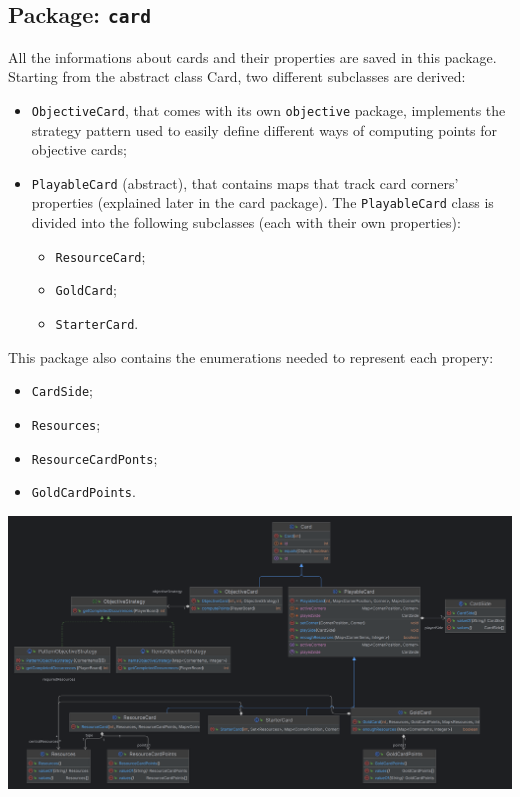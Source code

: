 \documentclass{article}
\begin{document}
\subsection{Package: \texttt{card}}
All the informations about cards and their properties are saved in this package.
Starting from the abstract class Card, two different subclasses are derived:
\begin{itemize}
    \item \texttt{ObjectiveCard}, that comes with its own \texttt{objective} package, implements the strategy pattern used to easily define different ways of computing points for objective cards;
    \item \texttt{PlayableCard} (abstract), that contains maps that track card corners' properties (explained later in the card package). \newline
    The \texttt{PlayableCard} class is divided into the following subclasses (each with their own properties):
    \begin{itemize}
        \item \texttt{ResourceCard};
        \item \texttt{GoldCard};
        \item \texttt{StarterCard}.
    \end{itemize}
\end{itemize}
This package also contains the enumerations needed to represent each propery:
\begin{itemize}
    \item \texttt{CardSide};
    \item \texttt{Resources};
    \item \texttt{ResourceCardPonts};
    \item \texttt{GoldCardPoints}.
\end{itemize}

\begin{center}
    \hspace*{-2cm}\includegraphics[scale=0.14]{card.png}
\end{center}
\newpage
\noindent
\end{document}
